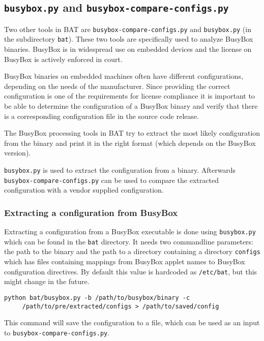 \documentclass[10pt]{article}
\begin{document}
\subsection{\texttt{busybox.py} and \texttt{busybox-compare-configs.py}}

Two other tools in BAT are \texttt{busybox-compare-configs.py} and
\texttt{busybox.py} (in the subdirectory \texttt{bat}). These two tools are
specifically used to analyze BusyBox binaries. BusyBox is in widespread use on
embedded devices and the license on BusyBox is actively enforced in court.

BusyBox binaries on embedded machines often have different configurations,
depending on the needs of the manufacturer. Since providing the correct
configuration is one of the requirements for license compliance it is important
to be able to determine the configuration of a BusyBox binary and verify that
there is a corresponding configuration file in the source code release.

The BusyBox processing tools in BAT try to extract the most likely
configuration from the binary and print it in the right format (which
depends on the BusyBox version).

\texttt{busybox.py} is used to extract the configuration from a binary.
Afterwards \texttt{busybox-compare-configs.py} can be used to compare the
extracted configuration with a vendor supplied configuration.

\subsubsection{Extracting a configuration from BusyBox}

Extracting a configuration from a BusyBox executable is done using
\texttt{busybox.py} which can be found in the \texttt{bat} directory. It needs
two commandline parameters: the path to the binary and the path to a directory
containing a directory \texttt{configs} which has files containing mappings
from BusyBox applet names to BusyBox configuration directives. By default this
value is hardcoded as \texttt{/etc/bat}, but this might change in the future.

\begin{verbatim}
python bat/busybox.py -b /path/to/busybox/binary -c
     /path/to/pre/extracted/configs > /path/to/saved/config
\end{verbatim}

This command will save the configuration to a file, which can be used as an
input to \texttt{busybox-compare-configs.py}.
\end{document}
